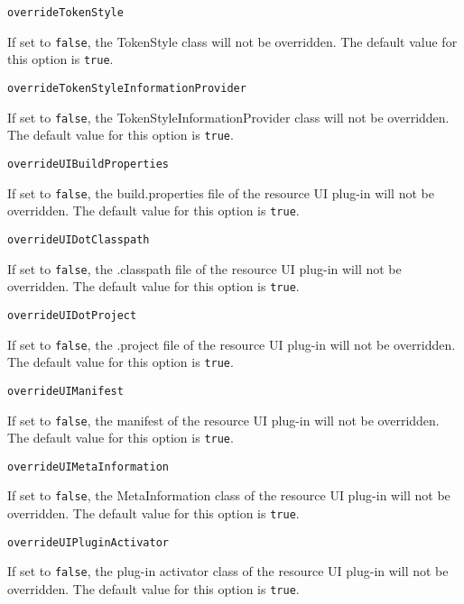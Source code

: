 \noindent\texttt{overrideTokenStyle}
\begin{myindentpar}{1cm}
If set to \texttt{false}, the TokenStyle class will not be overridden. The default value for this option is \texttt{true}.
\end{myindentpar}

\noindent\texttt{overrideTokenStyleInformationProvider}
\begin{myindentpar}{1cm}
If set to \texttt{false}, the TokenStyleInformationProvider class will not be overridden. The default value for this option is \texttt{true}.
\end{myindentpar}

\noindent\texttt{overrideUIBuildProperties}
\begin{myindentpar}{1cm}
If set to \texttt{false}, the build.properties file of the resource UI plug-in will not be overridden. The default value for this option is \texttt{true}.
\end{myindentpar}

\noindent\texttt{overrideUIDotClasspath}
\begin{myindentpar}{1cm}
If set to \texttt{false}, the .classpath file of the resource UI plug-in will not be overridden. The default value for this option is \texttt{true}.
\end{myindentpar}

\noindent\texttt{overrideUIDotProject}
\begin{myindentpar}{1cm}
If set to \texttt{false}, the .project file of the resource UI plug-in will not be overridden. The default value for this option is \texttt{true}.
\end{myindentpar}

\noindent\texttt{overrideUIManifest}
\begin{myindentpar}{1cm}
If set to \texttt{false}, the manifest of the resource UI plug-in will not be overridden. The default value for this option is \texttt{true}.
\end{myindentpar}

\noindent\texttt{overrideUIMetaInformation}
\begin{myindentpar}{1cm}
If set to \texttt{false}, the MetaInformation class of the resource UI plug-in will not be overridden. The default value for this option is \texttt{true}.
\end{myindentpar}

\noindent\texttt{overrideUIPluginActivator}
\begin{myindentpar}{1cm}
If set to \texttt{false}, the plug-in activator class of the resource UI plug-in will not be overridden. The default value for this option is \texttt{true}.
\end{myindentpar}

